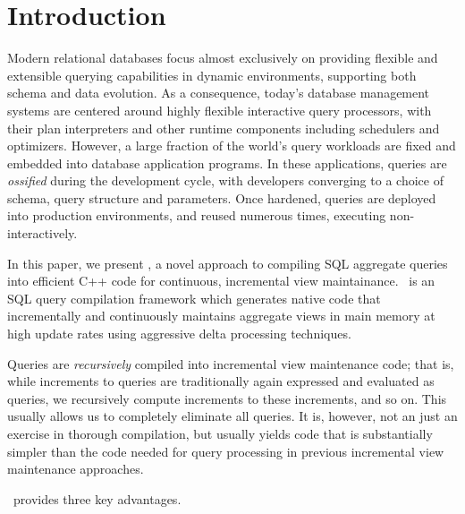 \section{Introduction}
\label{sec:intro}

Modern relational databases focus almost exclusively on providing flexible and
extensible querying capabilities in dynamic environments, supporting both schema
and data evolution.  As a consequence, today's database management systems are
centered around highly flexible interactive query processors, with their plan
interpreters and other runtime components including schedulers and optimizers.
However, a large fraction of the world's query workloads are fixed and embedded
into database application programs. In these applications, queries are
\textit{ossified} during the development cycle, with developers converging to a
choice of schema, query structure and parameters. Once hardened, queries are
deployed into production environments, and re\-used numerous times, executing
non-interactively.

In this paper, we present \compiler, a novel approach to compiling SQL aggregate
queries into efficient C++ code for continuous, incremental view maintainance.
\compiler\ is an SQL query compilation framework which generates native code
that incrementally and continuously maintains aggregate views in main memory at
high update rates using aggressive delta processing techniques.

Queries are {\em recursively}\/ compiled into incremental view maintenance code;
that is, while increments to queries are traditionally again expressed and
evaluated as que\-ries, we recursively compute increments to these increments,
and so on. This usually allows us to completely eliminate all queries.  It is,
however, not an just an exercise in thorough compilation, but usually yields
code that is substantially simpler than the code needed for query processing in
previous incremental view maintenance approaches.

\compiler\ provides three key advantages.

